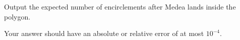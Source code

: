 
  Output the expected number of encirclements after Medea lands inside the polygon.

  Your answer should have an absolute or relative error of at most $10^{-4}$.
